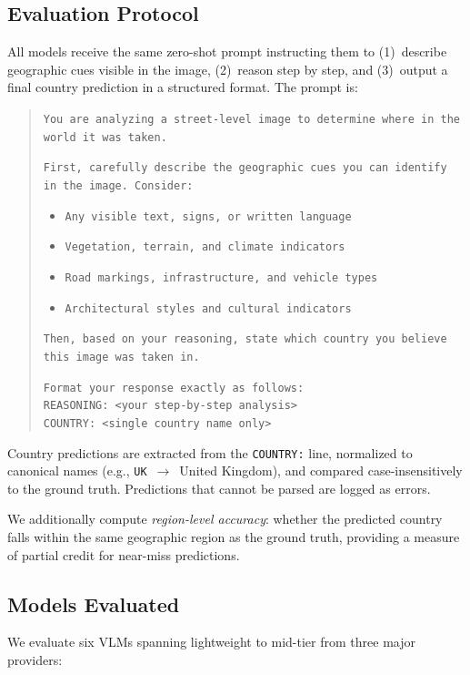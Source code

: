 \documentclass[twoside,11pt]{article}
\begin{document}
\subsection{Evaluation Protocol}

All models receive the same zero-shot prompt instructing them to (1)~describe geographic cues visible in the image, (2)~reason step by step, and (3)~output a final country prediction in a structured format. The prompt is:

\begin{quote}
\small
\texttt{You are analyzing a street-level image to determine where in the world it was taken.}

\texttt{First, carefully describe the geographic cues you can identify in the image. Consider:}
\begin{itemize}
    \item \texttt{Any visible text, signs, or written language}
    \item \texttt{Vegetation, terrain, and climate indicators}
    \item \texttt{Road markings, infrastructure, and vehicle types}
    \item \texttt{Architectural styles and cultural indicators}
\end{itemize}

\texttt{Then, based on your reasoning, state which country you believe this image was taken in.}

\texttt{Format your response exactly as follows:}\\
\texttt{REASONING: <your step-by-step analysis>}\\
\texttt{COUNTRY: <single country name only>}
\end{quote}

Country predictions are extracted from the \texttt{COUNTRY:} line, normalized to canonical names (e.g., \texttt{UK}~$\rightarrow$~United Kingdom), and compared case-insensitively to the ground truth. Predictions that cannot be parsed are logged as errors.

We additionally compute \emph{region-level accuracy}: whether the predicted country falls within the same geographic region as the ground truth, providing a measure of partial credit for near-miss predictions.

\subsection{Models Evaluated}

We evaluate six VLMs spanning lightweight to mid-tier from three major providers:
\end{document}
